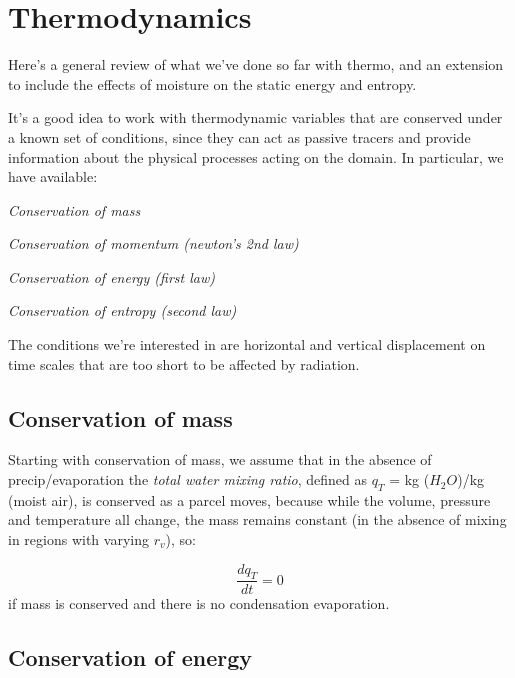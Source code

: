 \documentclass[12pt]{article}
\begin{document}
\pagestyle{first}


\section{Thermodynamics}
\label{sec:thermodynamics}

Here's a general review of what we've done so far with thermo, and an extension to include
the effects of moisture on the static energy and entropy.

It's a good idea to work with thermodynamic variables that are conserved under
a known set of conditions, since they can act as passive tracers and provide
information about the physical processes acting on the domain.  In particular,
we have available:

\begin{enumerate*}
  \item \textit{Conservation of mass}
  \item \textit{Conservation of momentum (newton's 2nd law)}
  \item \textit{Conservation of energy (first law)}
  \item \textit{Conservation of entropy (second law)}
\end{enumerate*}

The conditions we're interested in are horizontal and vertical
displacement on time scales that are too short to be affected by
radiation.  



\subsection{Conservation of mass}
\label{sec:conservation-mass}

Starting with conservation of mass, we assume that in the absence
of precip/evaporation the
\textit{total water mixing ratio}, defined as $q_T$ = kg ($H_2O$)/kg
(moist air), is conserved as a parcel moves, because while the volume,
pressure and temperature all change, the mass remains constant (in the
absence of mixing in regions with varying $r_v$), so:

\begin{equation}
  \label{eq:masscons}
  \frac{d q_T}{dt} = 0
\end{equation}
if mass is conserved and there is no condensation evaporation.

\subsection{Conservation of energy}
\label{sec:conservation-energy}
\end{document}
